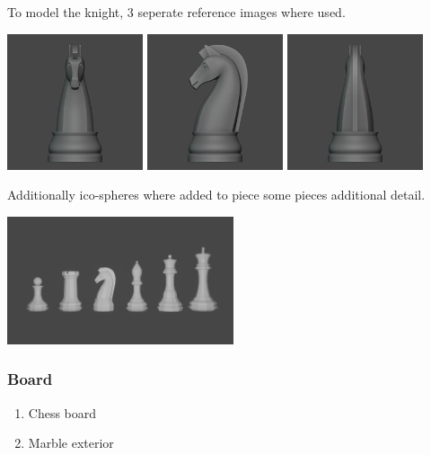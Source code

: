 \documentclass[11pt]{article}
\begin{document}
To model the knight, 3 seperate reference images where used.
\begin{center}
\includegraphics[width=0.3\textwidth]{ref/knight front.jpg}
\includegraphics[width=0.3\textwidth]{ref/knight right.jpg}
\includegraphics[width=0.3\textwidth]{ref/knight back.jpg}
\end{center}
Additionally ico-spheres where added  to piece some pieces additional detail.
\begin{center}
\includegraphics[width=0.5\textwidth]{Images/Pieces.png}
\end{center}
\subsubsection{Board}
\label{sec:org9e93267}
\begin{enumerate}
\item Chess board
\label{sec:orgc64f8a2}
\item Marble exterior
\label{sec:orgb95e97c}
\end{enumerate}
\end{document}
